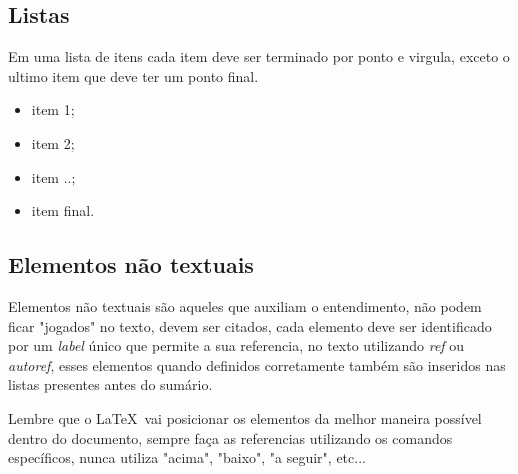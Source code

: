 


\subsection{Listas}

Em uma lista de itens cada item deve ser terminado por ponto e virgula, exceto o ultimo item que deve ter um ponto final.

\begin{itemize}
\item item 1;
\item item 2;
\item item ..;
\item item final.
\end{itemize}

\subsection{Elementos não textuais}

Elementos não textuais são aqueles que auxiliam o entendimento, não podem ficar "jogados" no texto, devem ser citados, cada elemento deve ser identificado por um \emph{label} único que permite a sua referencia, no texto utilizando \emph{ref} ou \emph{autoref}, esses elementos quando definidos corretamente também são inseridos nas listas presentes antes do sumário.

Lembre que o \LaTeX \  vai posicionar os elementos  da melhor maneira possível dentro do documento, sempre faça as referencias utilizando os comandos específicos, nunca utiliza "acima", "baixo", "a seguir", etc...









